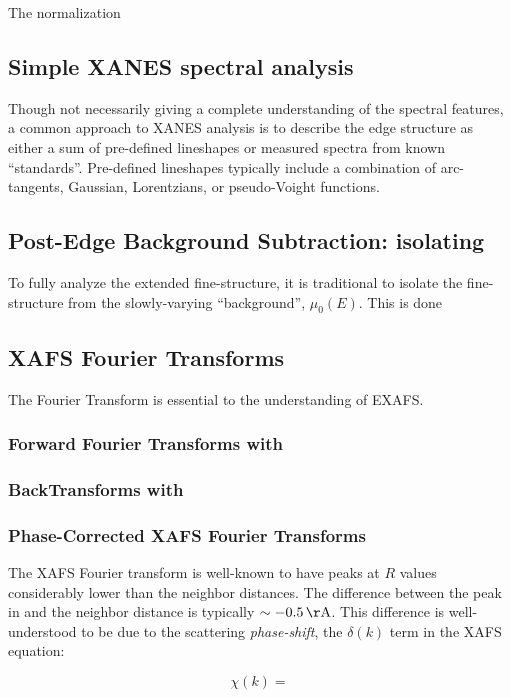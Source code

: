 The normalization


\subsection{Simple XANES spectral analysis}
\label{Ch:XAFSProcess-xanes} 


Though not necessarily giving a complete understanding of the spectral
features, a common approach to XANES analysis is to describe the edge
structure as either a sum of pre-defined lineshapes or measured spectra
from known ``standards''.  Pre-defined lineshapes typically include a
combination of arc-tangents, Gaussian, Lorentzians, or pseudo-Voight
functions.


\subsection{Post-Edge Background Subtraction: isolating {\chik}}
\label{Ch:XAFSProcess-postedge} 

To fully analyze the extended fine-structure, it is traditional to isolate
the fine-structure {\chik} from the slowly-varying ``background'',
{$\mu_0(E)$}.  This is done

\subsection{XAFS Fourier Transforms} \label{Ch:XAFSProcess-ft} 

The Fourier Transform is essential to the understanding of EXAFS.

\subsubsection{Forward Fourier Transforms with {}}
\label{Ch:XAFSProcess-fftf} 


\subsubsection{BackTransforms with {}}
\label{Ch:XAFSProcess-fftr} 

\subsubsection{Phase-Corrected XAFS Fourier Transforms} \label{Ch:XAFSProcess-pcft} 

The XAFS Fourier transform {\chir} is well-known to have peaks
at $R$ values considerably lower than the neighbor distances.  The
difference between the peak in {\chir} and the neighbor distance is
typically $\sim - 0.5\,\rm\AA$.  This difference is well-understood to be
due to the scattering {\emph{phase-shift}}, the $\delta(k)$ term in the
XAFS equation:

\[
\chi(k)  = 
\]



